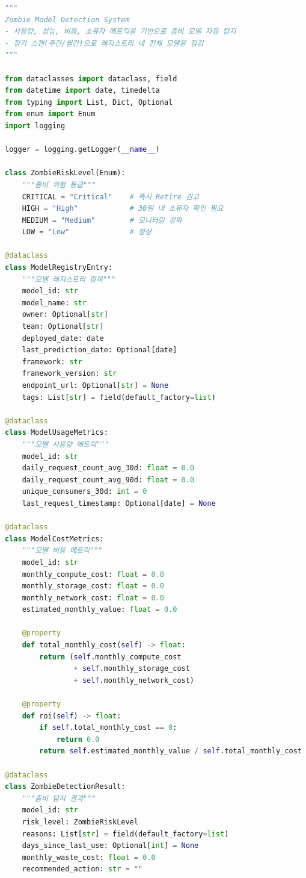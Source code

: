 \begin{lstlisting}[language=Python, caption={좀비 모델 탐지 자동화 시스템}, label={lst:zombie_detection}]
"""
Zombie Model Detection System
- 사용량, 성능, 비용, 소유자 메트릭을 기반으로 좀비 모델 자동 탐지
- 정기 스캔(주간/월간)으로 레지스트리 내 전체 모델을 점검
"""

from dataclasses import dataclass, field
from datetime import date, timedelta
from typing import List, Dict, Optional
from enum import Enum
import logging

logger = logging.getLogger(__name__)

class ZombieRiskLevel(Enum):
    """좀비 위험 등급"""
    CRITICAL = "Critical"    # 즉시 Retire 권고
    HIGH = "High"            # 30일 내 소유자 확인 필요
    MEDIUM = "Medium"        # 모니터링 강화
    LOW = "Low"              # 정상

@dataclass
class ModelRegistryEntry:
    """모델 레지스트리 항목"""
    model_id: str
    model_name: str
    owner: Optional[str]
    team: Optional[str]
    deployed_date: date
    last_prediction_date: Optional[date]
    framework: str
    framework_version: str
    endpoint_url: Optional[str] = None
    tags: List[str] = field(default_factory=list)

@dataclass
class ModelUsageMetrics:
    """모델 사용량 메트릭"""
    model_id: str
    daily_request_count_avg_30d: float = 0.0
    daily_request_count_avg_90d: float = 0.0
    unique_consumers_30d: int = 0
    last_request_timestamp: Optional[date] = None

@dataclass
class ModelCostMetrics:
    """모델 비용 메트릭"""
    model_id: str
    monthly_compute_cost: float = 0.0
    monthly_storage_cost: float = 0.0
    monthly_network_cost: float = 0.0
    estimated_monthly_value: float = 0.0

    @property
    def total_monthly_cost(self) -> float:
        return (self.monthly_compute_cost
                + self.monthly_storage_cost
                + self.monthly_network_cost)

    @property
    def roi(self) -> float:
        if self.total_monthly_cost == 0:
            return 0.0
        return self.estimated_monthly_value / self.total_monthly_cost

@dataclass
class ZombieDetectionResult:
    """좀비 탐지 결과"""
    model_id: str
    risk_level: ZombieRiskLevel
    reasons: List[str] = field(default_factory=list)
    days_since_last_use: Optional[int] = None
    monthly_waste_cost: float = 0.0
    recommended_action: str = ""


\end{lstlisting}
